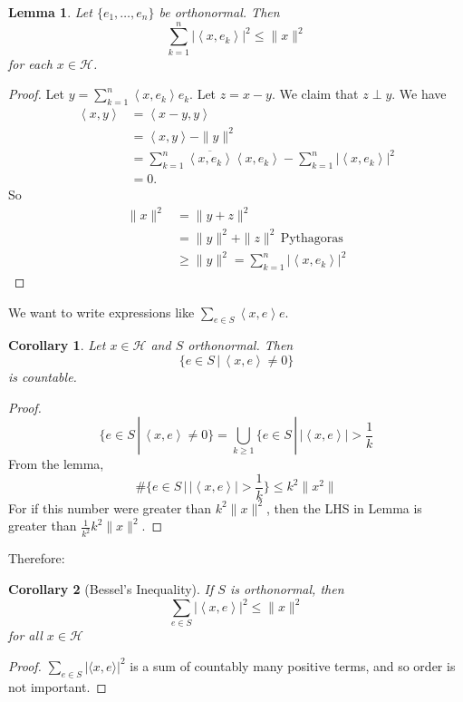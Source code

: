 \documentclass[10pt, oneside, reqno]{amsbook}
\theoremstyle{plain}%
\newtheorem{lem}[thm]{Lemma}
\newtheorem*{cor}{Corollary}
\theoremstyle{definition}
\theoremstyle{remark}
\newcommand{\Hil}{\mathcal{H}}
\newcommand{\iprod}[1]{\left\langle #1 \right\rangle}
\newcommand{\sumkn}{\sum_{k=1}^n}
\begin{document}
\begin{lem}
    Let $\{ e_1, \dots, e_n \}$ be orthonormal. Then \[
        \sumkn | \iprod{x, e_k} |^2 \leq \|x\|^2 
    \] for each $x \in \Hil$.  
\end{lem}
\begin{proof}
    Let $y = \sumkn \iprod{x, e_k} e_k$.  Let $z = x-y$.  We claim that $z \perp y$.  We have 
    \begin{align*}
        \iprod{x,y} &= \iprod{x-y, y} \\
                    &= \iprod{x,y} - \| y \|^2 \\
                    &= \sumkn \overline{\iprod{x,e_k}} \iprod{x, e_k} - \sumkn | \iprod {x, e_k} |^2 \\
                    &= 0.
    \end{align*}
    So \begin{align*}
        \| x \|^2   &= \|y + z \|^2 \\
                    &= \| y \|^2 + \| z \|^2 \, \text{Pythagoras} \\
                    &\geq \|y \|^2 = \sumkn | \iprod{x, e_k} |^2
    \end{align*} 
\end{proof}

We want to write expressions like $\sum_{e \in S} \iprod{x, e} e$.
\begin{cor}
    Let $x \in \Hil$ and $S$ orthonormal.  Then \[
        \{ e \in S \, | \, \iprod{x, e} \neq 0 \}
    \] is countable.  
\end{cor}

\begin{proof}
    \[
        \{ e \in S \, | \, \iprod{x, e} \neq 0 \} = \bigcup_{k \geq 1} \{ e \in S \, | \, |\iprod{x, e} | > \frac{1}{k}
    \] From the lemma, \[
        \# \{ e \in S \, | \, | \iprod{x,e} | > \frac{1}{k} \} \leq k^2 \| x ^2 \|
    \] For if this number were greater than $k^2 \| x \|^2$, then the LHS in Lemma is greater than $\frac{1}{k^2}k^2 \| x \|^2$.  
\end{proof} 

Therefore:
\begin{cor}[Bessel's Inequality]
    If $S$ is orthonormal, then \[
        \sum_{e \in S} | \iprod{x,e}|^2 \leq \| x \|^2
    \] for all $x \in \Hil$
\end{cor}
\begin{proof}
    $\sum_{e \in S} | \langle x, e \rangle|^2$ is a sum of countably many positive terms, and so order is not important.
\end{proof}
\end{document}
